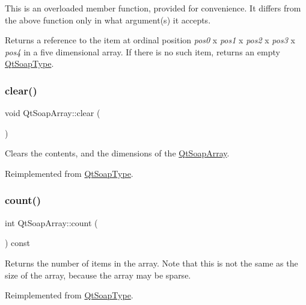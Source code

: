This is an overloaded member function, provided for convenience. It differs from the above function only in what argument(s) it accepts.

Returns a reference to the item at ordinal position {\itshape pos0} x {\itshape pos1} x {\itshape pos2} x {\itshape pos3} x {\itshape pos4} in a five dimensional array. If there is no such item, returns an empty \mbox{\hyperlink{class_qt_soap_type}{Qt\+Soap\+Type}}. \mbox{\label{class_qt_soap_array_a51440ed0ef64c0048bbc46dc5fbe4003}} 
\subsubsection{\texorpdfstring{clear()}{clear()}}
{\footnotesize\ttfamily void Qt\+Soap\+Array\+::clear (\begin{DoxyParamCaption}{ }\end{DoxyParamCaption})\hspace{0.3cm}{\ttfamily [virtual]}}

Clears the contents, and the dimensions of the \mbox{\hyperlink{class_qt_soap_array}{Qt\+Soap\+Array}}. 

Reimplemented from \mbox{\hyperlink{class_qt_soap_type_a9fac9664d334143114c31610ef02c53d}{Qt\+Soap\+Type}}.

\mbox{\label{class_qt_soap_array_a5cf3ee6dc1faf7198be24fcfdf0e3bb8}} 
\subsubsection{\texorpdfstring{count()}{count()}}
{\footnotesize\ttfamily int Qt\+Soap\+Array\+::count (\begin{DoxyParamCaption}{ }\end{DoxyParamCaption}) const\hspace{0.3cm}{\ttfamily [virtual]}}

Returns the number of items in the array. Note that this is not the same as the size of the array, because the array may be sparse. 

Reimplemented from \mbox{\hyperlink{class_qt_soap_type_a8d6c4868a786f3b7fd6784a45501e16f}{Qt\+Soap\+Type}}.

\mbox{\label{class_qt_soap_array_a7be8113dc4c686e1ea243b988269f50d}} 
